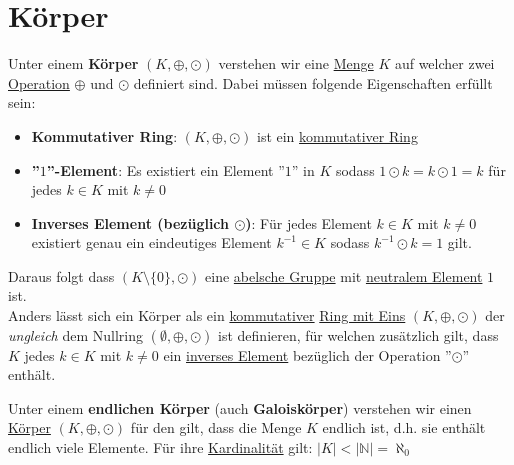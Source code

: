 \documentclass[../../main.tex]{subfiles}
\begin{document}
		\section{Körper}
		\begin{definition}[Körper]
			\label{def:Körper}
			Unter einem \textbf{Körper} $(K, \oplus, \odot)$ verstehen wir eine \hyperref[def:Menge]{Menge} $K$ auf welcher zwei \hyperref[def:Operation]{Operation} $\oplus$ und $\odot$ definiert sind. Dabei müssen folgende Eigenschaften erfüllt sein: 
			\begin{itemize}
				\item \textbf{Kommutativer Ring}: $(K, \oplus, \odot)$ ist ein \hyperref[def:kommutativerRing]{kommutativer Ring}
				\item \textbf{''$1$''-Element}: Es existiert ein Element ''$1$'' in $K$ sodass $1 \odot k = k \odot 1 = k$ für jedes $k \in K$ mit $k\not=0$ 
				\item \textbf{Inverses Element (bezüglich $\odot$)}: Für jedes Element $k\in K$ mit $k\not = 0$ existiert genau ein eindeutiges Element $k^{-1} \in K$ sodass $k^{-1} \odot k = 1$ gilt.
			\end{itemize}
			Daraus folgt dass $(K\setminus \{0\}, \odot)$ eine \hyperref[def:abelscheGruppe]{abelsche Gruppe} mit \hyperref[def:neutralesElement]{neutralem Element} $1$ ist. \\
			
			Anders lässt sich ein Körper als ein \hyperref[def:kommutativerRing]{kommutativer} \hyperref[def:RingMitEins]{Ring mit Eins} $(K,\oplus,\odot)$ der \textit{ungleich} dem Nullring $(\emptyset, \oplus, \odot)$ ist definieren, für welchen zusätzlich gilt, dass $K$ jedes $k \in K$ mit $k \not = 0$ ein \hyperref[def:inversesElement]{inverses Element} bezüglich der Operation ''$\odot$'' enthält.
		\end{definition}
	
		\begin{definition}
			\label{def:endlicherKörper}
			\label{def:Galoiskörper}
			Unter einem \textbf{endlichen Körper} (auch \textbf{Galoiskörper}) verstehen wir einen \hyperref[def:Körper]{Körper} $(K, \oplus, \odot)$ für den gilt, dass die Menge $K$ endlich ist, d.h. sie enthält endlich viele Elemente. Für ihre \hyperref[def:Kardinalität]{Kardinalität} gilt: $|K| < |\mathbb{N}| =\aleph_0$
		\end{definition}
	
\end{document}
